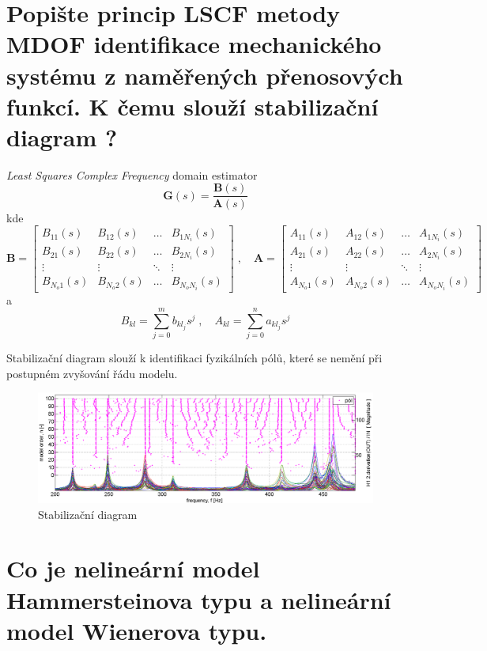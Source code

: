 \documentclass{article}
\begin{document}
	\section{Popište princip LSCF metody MDOF identifikace mechanického systému z naměřených přenosových funkcí. K čemu slouží stabilizační diagram ? }
	\emph{Least Squares Complex Frequency} domain estimator
	\begin{equation}
		\bm{G}(s) = \frac{\bm{B}(s)}{\bm{A}(s)}
	\end{equation}
	kde
	\begin{equation}
		\bm{B}
		=
		\begin{bmatrix}
			B_{11}(s) & B_{12}(s) & \dots & B_{1N_i}(s) \\
			B_{21}(s) & B_{22}(s) & \dots & B_{2N_i}(s) \\
			\vdots & \vdots & \ddots & \vdots \\
			B_{N_o 1}(s) & B_{N_o 2}(s) & \dots & B_{N_o N_i}(s)
		\end{bmatrix}
		\;,\quad 
		\bm{A}
		=
		\begin{bmatrix}
			A_{11}(s) & A_{12}(s) & \dots & A_{1N_i}(s) \\
			A_{21}(s) & A_{22}(s) & \dots & A_{2N_i}(s) \\
			\vdots & \vdots & \ddots & \vdots \\
			A_{N_o 1}(s) & A_{N_o 2}(s) & \dots & A_{N_o N_i}(s)
		\end{bmatrix}
	\end{equation}
	a
	\begin{equation}
	B_{kl} = \sum_{j=0}^m b_{{kl}_j} s^j
	\;,\quad 
	A_{kl} = \sum_{j=0}^n a_{{kl}_j} s^j
	\end{equation}

	Stabilizační diagram slouží k identifikaci fyzikálních pólů, které se nemění při postupném zvyšování řádu modelu.
	\begin{figure}[h!]
		\centering
		\includegraphics[width=.6\linewidth]{figs/StabilizacniDiagram.png}
		\caption{Stabilizační diagram}
	\end{figure}
	
	\section{Co je nelineární model Hammersteinova typu a nelineární model Wienerova typu. }
\end{document}
